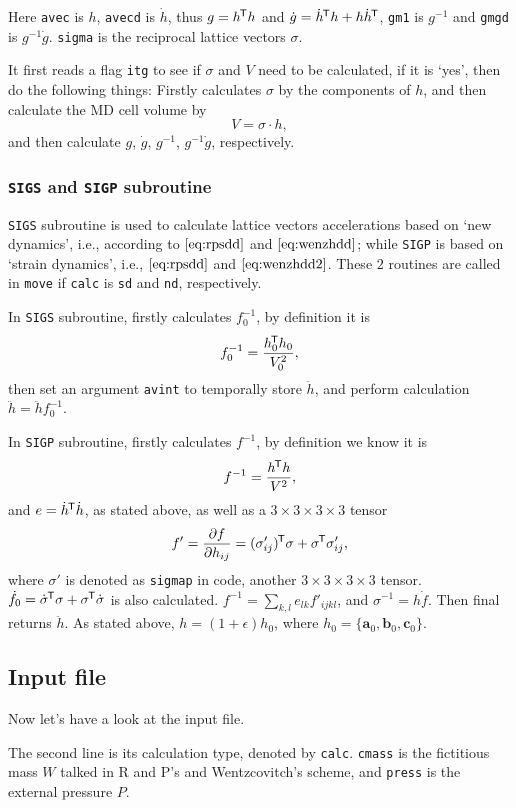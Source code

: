 Here \texttt{avec} is $h$, \texttt{avecd} is $\dot{ h }$, thus $g = h^{\mkern-1.5mu\mathsf{T}} h$
and $\dot{g}  = \dot{ h }^{\mkern-1.5mu\mathsf{T}} h + h \dot{ h }^{\mkern-1.5mu\mathsf{T}}$, \texttt{gm1} is $g^{-1}$
and \texttt{gmgd} is $g^{-1} \dot{g}$. \texttt{sigma} is the reciprocal lattice
vectors $\sigma$.

It first reads a flag \texttt{itg} to see if $\sigma$ and $V$ need to be calculated,
if it is `yes', then do the following things:
Firstly calculates $\sigma$ by the components of $h$, and then calculate the
MD cell volume by
\begin{equation}
	V = \sigma \cdot h,
\end{equation}
and then calculate $g$, $\dot{ g }$, $g^{-1}$, $g^{-1}\dot{g}$, respectively.


\subsubsection{\texttt{SIGS} and \texttt{SIGP} subroutine}

\texttt{SIGS} subroutine is used to calculate lattice vectors accelerations
based on `new dynamics', i.e., according to $\eqref{eq:rpsdd}$ and
$\eqref{eq:wenzhdd}$; while \texttt{SIGP} is based on `strain dynamics',
i.e., $\eqref{eq:rpsdd}$ and $\eqref{eq:wenzhdd2}$. These $2$ routines
are called in \texttt{move} if \texttt{calc} is \texttt{sd} and \texttt{nd}, respectively.

In \texttt{SIGS} subroutine,
firstly calculates $f_0^{-1}$, by definition it is
\begin{equation}
	f_0^{-1} = \frac{ h_0 ^{\mkern-1.5mu\mathsf{T}} h_0}{ V_0^2 },
\end{equation}
then set an argument \texttt{avint} to temporally store $\ddot{h}$,
and perform calculation $\ddot{h} = \ddot{h} f_0^{-1}$.

In \texttt{SIGP} subroutine,
firstly calculates $f^{-1}$, by definition we know it is
\begin{equation}
	f^{-1} = \frac{ h ^{\mkern-1.5mu\mathsf{T}} h }{ V^2 },
\end{equation}
and $e = \dot{ h }^{\mkern-1.5mu\mathsf{T}} \dot{ h }$, as stated above, as well as
a $3\times 3 \times 3 \times 3$ tensor
\begin{equation}
	f ' = \frac{ \partial f }{ \partial h_{ij} } = (\sigma'_{ij})^{\mkern-1.5mu\mathsf{T}} \sigma
	+ \sigma ^{\mkern-1.5mu\mathsf{T}} \sigma'_{ij},
\end{equation}
where $\sigma'$ is denoted as \texttt{sigmap} in code, another $3\times 3
\times 3 \times 3$ tensor.
$\dot{f}_0 = \dot{ \sigma } ^{\mkern-1.5mu\mathsf{T}} \sigma + \sigma ^{\mkern-1.5mu\mathsf{T}} \dot{ \sigma }$ is
also calculated.
$f^{-1} = \sum_{k, l} e_{lk} f'_{ijkl}$, and $\sigma^{-1} = h \dot{ f }$.
Then final returns $\ddot{h}$. As stated above, $h = (1 + \epsilon) h_0$,
where $h_0 = \{ \bm{a}_0, \bm{b}_0, \bm{c}_0 \}$.


\subsection{Input file}

Now let's have a look at the input file.

The second line is its calculation type, denoted by
\texttt{calc}. \texttt{cmass} is the fictitious mass $W$ talked
in R and P's and Wentzcovitch's scheme, and \texttt{press} is the
external pressure $P$.


